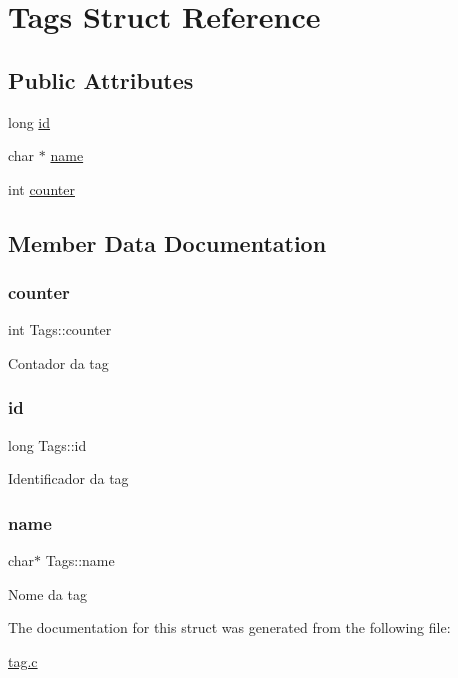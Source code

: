 \hypertarget{structTags}{}\section{Tags Struct Reference}
\label{structTags}
\subsection*{Public Attributes}
\begin{DoxyCompactItemize}
\item 
long \hyperlink{structTags_a202dd6fd44086ebc23a88878803e006d}{id}
\item 
char $\ast$ \hyperlink{structTags_a5bb5aaf2b7b7a88f903a39b532b4b37d}{name}
\item 
int \hyperlink{structTags_aad5f0f20967316b55c1b01cc35452885}{counter}
\end{DoxyCompactItemize}


\subsection{Member Data Documentation}
\mbox{\label{structTags_aad5f0f20967316b55c1b01cc35452885}} 
\subsubsection{\texorpdfstring{counter}{counter}}
{\footnotesize\ttfamily int Tags\+::counter}

Contador da tag \mbox{\label{structTags_a202dd6fd44086ebc23a88878803e006d}} 
\subsubsection{\texorpdfstring{id}{id}}
{\footnotesize\ttfamily long Tags\+::id}

Identificador da tag \mbox{\label{structTags_a5bb5aaf2b7b7a88f903a39b532b4b37d}} 
\subsubsection{\texorpdfstring{name}{name}}
{\footnotesize\ttfamily char$\ast$ Tags\+::name}

Nome da tag 

The documentation for this struct was generated from the following file\+:\begin{DoxyCompactItemize}
\item 
\hyperlink{tag_8c}{tag.\+c}\end{DoxyCompactItemize}
